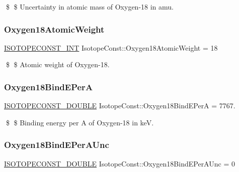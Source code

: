 \$ \$ Uncertainty in atomic mass of Oxygen-\/18 in amu. \mbox{\label{group___isotope_const-_oxygen-_o18_ga057fda0883bde5c290c0efe43dbe0672}} 
\subsubsection{\texorpdfstring{Oxygen18\+Atomic\+Weight}{Oxygen18AtomicWeight}}
{\footnotesize\ttfamily \mbox{\hyperlink{group___isotope_const-_macros_ga5f18360b3e99483a35c32d789e62621c}{I\+S\+O\+T\+O\+P\+E\+C\+O\+N\+S\+T\+\_\+\+I\+NT}} Isotope\+Const\+::\+Oxygen18\+Atomic\+Weight = 18}

\$ \$ Atomic weight of Oxygen-\/18. \mbox{\label{group___isotope_const-_oxygen-_o18_gaf880cd41b55890a21825463f1f519862}} 
\subsubsection{\texorpdfstring{Oxygen18\+Bind\+E\+PerA}{Oxygen18BindEPerA}}
{\footnotesize\ttfamily \mbox{\hyperlink{group___isotope_const-_macros_ga8f45a7272ce02c0b4c65c44636ed719a}{I\+S\+O\+T\+O\+P\+E\+C\+O\+N\+S\+T\+\_\+\+D\+O\+U\+B\+LE}} Isotope\+Const\+::\+Oxygen18\+Bind\+E\+PerA = 7767.}

\$ \$ Binding energy per A of Oxygen-\/18 in keV. \mbox{\label{group___isotope_const-_oxygen-_o18_ga3d63f496715fdd0027fe714b1703d6db}} 
\subsubsection{\texorpdfstring{Oxygen18\+Bind\+E\+Per\+A\+Unc}{Oxygen18BindEPerAUnc}}
{\footnotesize\ttfamily \mbox{\hyperlink{group___isotope_const-_macros_ga8f45a7272ce02c0b4c65c44636ed719a}{I\+S\+O\+T\+O\+P\+E\+C\+O\+N\+S\+T\+\_\+\+D\+O\+U\+B\+LE}} Isotope\+Const\+::\+Oxygen18\+Bind\+E\+Per\+A\+Unc = 0}

